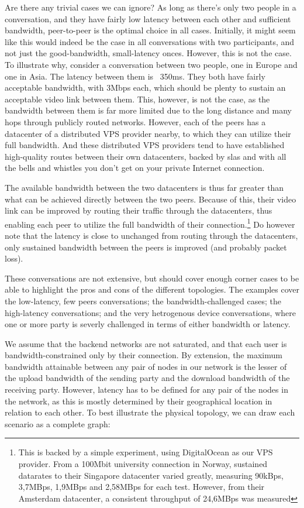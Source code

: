 Are there any trivial cases we can ignore? As long as there's only two people in a conversation, and they have fairly low latency between each other and sufficient bandwidth, peer-to-peer is the optimal choice in all cases. Initially, it might seem like this would indeed be the case in all conversations with two participants, and not just the good-bandwidth, small-latency onces. However, this is not the case. To illustrate why, consider a conversation between two people, one in Europe and one in Asia. The latency between them is ~350ms. They both have fairly acceptable bandwidth, with 3Mbps each, which should be plenty to sustain an acceptable video link between them. This, however, is not the case, as the bandwidth between them is far more limited due to the long distance and many hops through publicly routed networks. However, each of the peers has a datacenter of a distributed VPS provider nearby, to which they can utilize their full bandwidth. And these distributed VPS providers tend to have established high-quality routes between their own datacenters, backed by \glspl{sla} and with all the bells and whistles you don't get on your private Internet connection.

The available bandwidth between the two datacenters is thus far greater than what can be achieved directly between the two peers. Because of this, their video link can be improved by routing their traffic through the datacenters, thus enabling each peer to utilize the full bandwidth of their connection.\footnote{This is backed by a simple experiment, using DigitalOcean as our VPS provider. From a 100Mbit university connection in Norway, sustained datarates to their Singapore datacenter varied greatly, measuring 90kBps, 3,7MBps, 1,9MBps and 2,58MBps for each test. However, from their Amsterdam datacenter, a consistent throughput of 24,6MBps was measured} Do however note that the latency is close to unchanged from routing through the datacenters, only sustained bandwidth between the peers is improved (and probably packet loss).

These conversations are not extensive, but should cover enough corner cases to be able to highlight the pros and cons of the different topologies. The examples cover the low-latency, few peers conversations; the bandwidth-challenged cases; the high-latency conversations; and the very hetrogenous device conversations, where one or more party is severly challenged in terms of either bandwidth or latency.

We assume that the backend networks are not saturated, and that each user is bandwidth-constrained only by their connection. By extension, the maximum bandwidth attainable between any pair of nodes in our network is the lesser of the upload bandwidth of the sending party and the download bandwidth of the receiving party. However, latency has to be defined for any pair of the nodes in the network, as this is mostly determined by their geographical location in relation to each other. To best illustrate the physical topology, we can draw each scenario as a complete graph:


